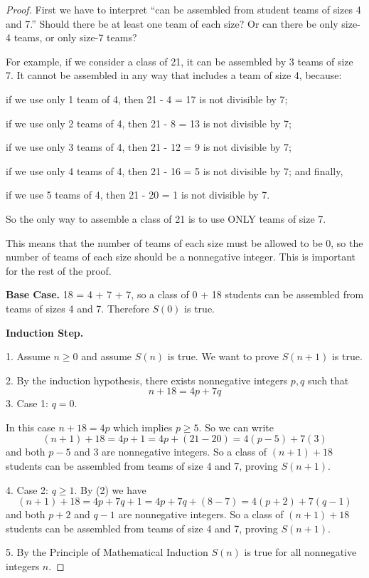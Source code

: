 \documentclass[14pt]{extarticle}
\begin{document}
\begin{proof}
First we have to interpret ``can be assembled from student teams of sizes 4 and 7.'' Should there be at least one team of each size? Or can there be only size-4 teams, or only size-7 teams?

For example, if we consider a class of 21, it can be assembled by 3 teams of size 7. It cannot be assembled in any way that includes a team of size 4, because: 

if we use only 1 team of 4, then 21 - 4 = 17 is not divisible by 7; 

if we use only 2 teams of 4, then 21 - 8 = 13 is not divisible by 7; 

if we use only 3 teams of 4, then 21 - 12 = 9 is not divisible by 7; 

if we use only 4 teams of 4, then 21 - 16 = 5 is not divisible by 7; and finally,

if we use 5 teams of 4, then 21 - 20 = 1 is not divisible by 7.

So the only way to assemble a class of 21 is to use ONLY teams of size 7.

This means that the number of teams of each size must be allowed to be 0, so the number of teams of each size should be a nonnegative integer. This is important for the rest of the proof.

{\bf Base Case.} 18 = 4 + 7 + 7, so a class of 0 + 18 students can be assembled from teams of sizes 4 and 7. Therefore $S(0)$ is true.

{\bf Induction Step.} 

1. Assume $n \geq 0$ and assume $S(n)$ is true. We want to prove $S(n+1)$ is true.

2. By the induction hypothesis, there exists nonnegative integers $p, q$ such that
$$
n + 18 = 4p + 7q
$$
3. Case 1: $q = 0$. 

In this case $n + 18 = 4p$ which implies $p \geq 5$. So we can write
$$
(n+1) + 18 = 4p + 1 = 4p + (21 - 20) = 4(p - 5) + 7(3)
$$
and both $p - 5$ and 3 are nonnegative integers. So a class of $(n+1)+18$ students can be assembled from teams of size 4 and 7, proving $S(n+1)$.

4. Case 2: $q \geq 1$. By (2) we have
$$
(n+1) + 18 = 4p + 7q + 1 = 4p + 7q + (8 - 7) = 4(p+2) + 7(q-1)
$$
and both $p+2$ and $q-1$ are nonnegative integers. So a class of $(n+1)+18$ students can be assembled from teams of size 4 and 7, proving $S(n+1)$.

5. By the Principle of Mathematical Induction $S(n)$ is true for all nonnegative integers $n$.
\end{proof}
\end{document}
